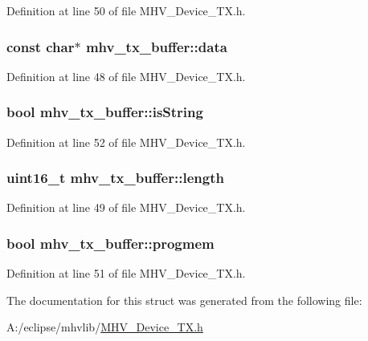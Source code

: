 Definition at line 50 of file M\-H\-V\-\_\-\-Device\-\_\-\-T\-X.\-h.

\hypertarget{structmhv__tx__buffer_a7523481b7a0b1d4972a79a4de6e528af}{
\subsubsection[{data}]{\setlength{\rightskip}{0pt plus 5cm}const char$\ast$ mhv\-\_\-tx\-\_\-buffer\-::data}}\label{structmhv__tx__buffer_a7523481b7a0b1d4972a79a4de6e528af}


Definition at line 48 of file M\-H\-V\-\_\-\-Device\-\_\-\-T\-X.\-h.

\hypertarget{structmhv__tx__buffer_a945fe73e41c397f3c4f7765c97469a35}{
\subsubsection[{is\-String}]{\setlength{\rightskip}{0pt plus 5cm}bool mhv\-\_\-tx\-\_\-buffer\-::is\-String}}\label{structmhv__tx__buffer_a945fe73e41c397f3c4f7765c97469a35}


Definition at line 52 of file M\-H\-V\-\_\-\-Device\-\_\-\-T\-X.\-h.

\hypertarget{structmhv__tx__buffer_ac05ef0da2f6fce474bec691e8e1fb4e2}{
\subsubsection[{length}]{\setlength{\rightskip}{0pt plus 5cm}uint16\-\_\-t mhv\-\_\-tx\-\_\-buffer\-::length}}\label{structmhv__tx__buffer_ac05ef0da2f6fce474bec691e8e1fb4e2}


Definition at line 49 of file M\-H\-V\-\_\-\-Device\-\_\-\-T\-X.\-h.

\hypertarget{structmhv__tx__buffer_a0b9b692bdd3d83c9a53e19a5c951fb74}{
\subsubsection[{progmem}]{\setlength{\rightskip}{0pt plus 5cm}bool mhv\-\_\-tx\-\_\-buffer\-::progmem}}\label{structmhv__tx__buffer_a0b9b692bdd3d83c9a53e19a5c951fb74}


Definition at line 51 of file M\-H\-V\-\_\-\-Device\-\_\-\-T\-X.\-h.



The documentation for this struct was generated from the following file\-:\begin{DoxyCompactItemize}
\item 
A\-:/eclipse/mhvlib/\hyperlink{_m_h_v___device___t_x_8h}{M\-H\-V\-\_\-\-Device\-\_\-\-T\-X.\-h}\end{DoxyCompactItemize}
